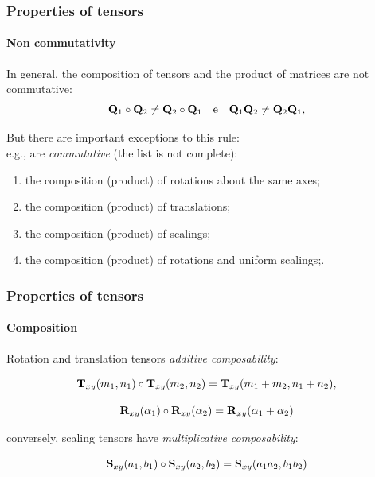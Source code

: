 \documentclass{beamer}
\begin{document}
\begin{frame}\frametitle{Properties of tensors}
\framesubtitle{Non commutativity}

\vfill
 
In general,  the composition of tensors  and the product of matrices are not commutative:
\[
{\bf Q}_1\circ {\bf Q}_2 \not= {\bf Q}_2\circ {\bf Q}_1 \quad\mbox{e}\quad
{\bf Q}_1 {\bf Q}_2 \not= {\bf Q}_2 {\bf Q}_1,
\]

\vfill

But there are important exceptions to this rule:\\
e.g., are \emph{commutative} (the list is not complete):

\vfill

\begin{enumerate}
    \item the composition (product) of rotations about the same axes;
    \item\vspace{-2mm} the composition (product) of translations;
    \item\vspace{-2mm} the composition (product) of scalings;
    \item\vspace{-2mm} the composition (product) of rotations and uniform scalings;.
\end{enumerate}

\end{frame}
\begin{frame}\frametitle{Properties of tensors}
\framesubtitle{Composition}

\vfill
Rotation and translation tensors \emph{additive composability}:

\[
{\bf T}_{xy}(m_1,n_1)\circ {\bf T}_{xy}(m_2,n_2) = {\bf T}_{xy}(m_1+m_2,n_1+n_2),
\]

\[
{\bf R}_{xy}(\alpha_1)\circ {\bf R}_{xy}(\alpha_2)= {\bf R}_{xy}(\alpha_1+\alpha_2)
\]
\vfill

conversely, scaling tensors have \emph{multiplicative composability}:

\[
{\bf S}_{xy}(a_1,b_1)\circ {\bf S}_{xy}(a_2,b_2)= {\bf S}_{xy}(a_1 a_2,b_1 b_2)
\]

\vfill

\end{frame}
\end{document}
